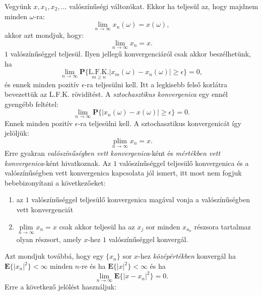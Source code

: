 \documentclass{article}
\begin{document}
Vegyünk $x,x_1,x_2,\ldots$ valószínűségi változókat. Ekkor ha teljesül az, hogy majdnem minden $\omega$-ra: 
\begin{equation}
 \lim_{n \to \infty} x_{n}(\omega) = x(\omega),
\end{equation}
akkor azt mondjuk, hogy:
\begin{equation}
 \lim_{n \to \infty} x_{n} = x.
\end{equation}
$1$ valószínűséggel teljesül. Ilyen jellegű konvergenciáról csak akkor beszélhetünk, ha  
\begin{equation}
	\lim_{n \to \infty} \mathrm{\textbf{P}}\{\underset{m \geq n}{\mathrm{L.F.K.}} |x_{m}(\omega) - x_{n}(\omega) | \geq \epsilon \} = 0,
\end{equation}
és ennek minden pozitív $\epsilon$-ra teljesülni kell. Itt a legkisebb felső korlátra bevezettük az L.F.K. rövidítést. A \textit{sztochasztikus konvergenica} egy ennél gyengébb feltétel:
\begin{equation}
	\lim_{n \to \infty} \mathrm{\textbf{P}}\{|x_{n}(\omega) - x(\omega) | \geq \epsilon \} = 0.
\end{equation}
Ennek minden pozitív $\epsilon$-ra teljesülni kell. A sztochasztikus konvergenicát így jelöljük: 
\begin{equation}
	\underset{n \to \infty}{\operatorname{plim}} x_{n} = x.
\end{equation}
Erre gyakran \textit{valószínűségben vett konvergenica}-ként és \textit{mértékben vett konvergenica}-ként hivatkoznak. Az $1$ valószínűséggel teljesülő konvergenica és a valószínűségben vett konvergenica kapcsolata jól ismert, itt most nem fogjuk bebebizonyítani a következőeket:
\begin{enumerate}[label=(\alph*)]
 \item az $1$ valószínűséggel teljesülő konvergenica magával vonja a valószínűségben vett konvergenciát
 \item $\underset{n \to \infty}{\operatorname{plim}} x_{n} = x$ csak akkor teljesül ha az $x_j$ sor minden $x_{a_n}$ részsora tartalmaz olyan részsort, amely $x$-hez $1$ valószínűséggel konvergál.
\end{enumerate}
Azt mondjuk továbbá, hogy egy $\{x_n\}$ sor $x$-hez \textit{középértékben} konvergál ha $\mathrm{\textbf{E}}\{|x_n|^2\} < \infty$ minden $n$-re és ha $\mathrm{\textbf{E}}\{|x|^2\} < \infty$ és ha
\begin{equation}
\lim_{n \to \infty} \mathrm{\textbf{E}}\{|x-x_n|^2\} = 0.
\end{equation}
Erre a következő jelölést használjuk:
\end{document}
